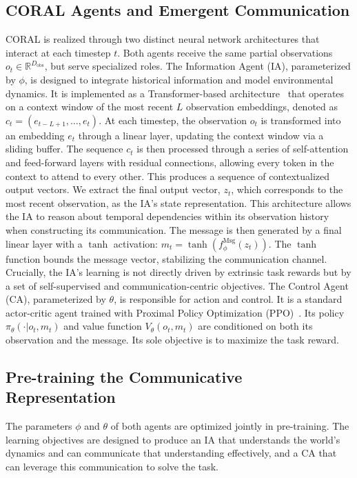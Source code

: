\documentclass[letterpaper]{article}
\begin{document}
\subsection{CORAL Agents and Emergent Communication}
CORAL is realized through two distinct neural network architectures that interact at each timestep $t$. Both agents receive the same partial observations  $o_t \in \mathbb{R}^{D_{\text{obs}}}$, but serve specialized roles. The Information Agent (IA), parameterized by $\phi$, is designed to integrate historical information and model environmental dynamics. It is implemented as a  Transformer-based architecture~\cite{vaswani2017attention} that operates on a context window of the most recent $L$ observation embeddings, denoted as $c_t = (e_{t-L+1}, \ldots, e_t)$. At each timestep, the observation $o_t$ is transformed into an embedding $e_t$ through a linear layer, updating the context window via a sliding buffer. The sequence $c_t$ is then processed through a series of self-attention and feed-forward layers with residual connections, allowing every token in the context to attend to every other. This produces a sequence of contextualized output vectors.
We extract the final output vector, $z_t$, which corresponds to the most recent observation, as the IA's state representation. This architecture allows the IA to reason about temporal dependencies within its observation history when constructing its communication. The message is then generated by a final linear layer with a $\tanh$ activation: $m_t = \tanh(f_{\phi}^{\text{Msg}}(z_t))$. The $\tanh$ function bounds the message vector, stabilizing the communication channel. Crucially, the IA's learning is not directly driven by extrinsic task rewards but by a set of self-supervised and communication-centric objectives.
The Control Agent (CA), parameterized by $\theta$, is responsible for action and control. It is a standard actor-critic agent trained with Proximal Policy Optimization (PPO)~\cite{schulman2017proximal}. Its policy $\pi_{\theta}(\cdot|o_t, m_t)$ and value function $V_{\theta}(o_t, m_t)$ are conditioned on both its observation and the message. Its sole objective is to maximize the task reward.
\subsection{Pre-training the Communicative Representation}
The parameters $\phi$ and $\theta$ of both agents are optimized jointly in pre-training. The learning objectives are designed to produce an IA that understands the world's dynamics and can communicate that understanding effectively, and a CA that can leverage this communication to solve the task.
\end{document}
